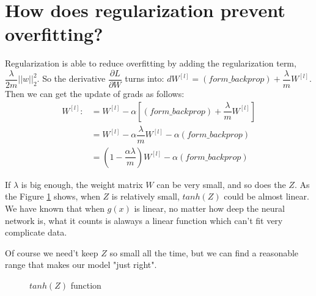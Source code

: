 \documentclass{article}
\begin{document}
\section{How does regularization prevent overfitting?}
\indent Regularization is able to reduce overfitting by adding the regularization term, $\dfrac{\lambda}{2m}||w||_{2}^{2}$. So the derivative $\dfrac{\partial L}{\partial W}$ turns into: $dW^{[l]}=(form\_backprop)+\dfrac{\lambda}{m}W^{[l]}$. Then we can get the update of grads as follows:
\begin{align}
W^{[l]}:&=W^{[l]}-\alpha [ (form\_backprop)+\dfrac{\lambda}{m}W^{[l]}]\\
&=W^{[l]}-\alpha\dfrac{\lambda}{m}W^{[l]}-\alpha(form\_backprop)\\
&=(1-\dfrac{\alpha\lambda}{m})W^{[l]}-\alpha(form\_backprop)
\end{align} 




\indent If $\lambda$ is big enough, the weight matrix $W$ can be very small, and so does the $Z$. As the Figure \ref{tanh} shows, when $Z$ is relatively small, $tanh(Z)$ could be almost linear. We have known that when $g(x)$ is linear, no matter how deep the neural network is, what it counts is alaways a linear function which can't fit very complicate data.

\indent Of course we need't keep $Z$ so small all the time, but we can find a reasonable range that makes our model "just right".

\par
\begin{figure}[htbp]
\caption{$tanh(Z)$ function}
\label{tanh}%
\end{figure}
\end{document}
